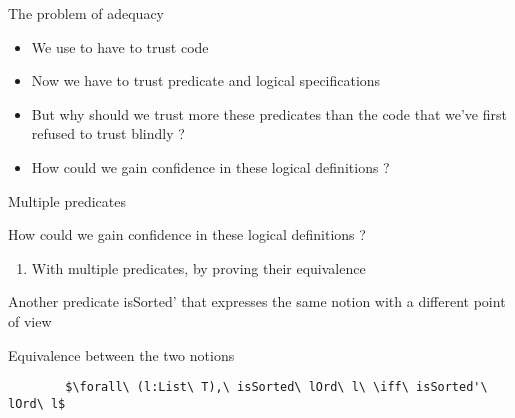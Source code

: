 \documentclass[french]{beamer}
\begin{document}
\begin{frame}{The problem of adequacy}

	\begin{itemize}

\item We use to have to trust code 

\item Now we have to trust predicate and logical specifications

\item But why should we trust more these predicates than the code that we've first refused to trust blindly ?

\item How could we gain confidence in these logical definitions ?

	\end{itemize}

\end{frame}


\begin{frame}[fragile]{Multiple predicates}

How could we gain confidence in these logical definitions ?

\begin{enumerate}
\item With multiple predicates, by proving their equivalence
\end{enumerate}

Another predicate isSorted' that expresses the same notion with a different point of view

	\begin{block}{Equivalence between the two notions}

		\begin{lstlisting}
    	$\forall\ (l:List\ T),\ isSorted\ lOrd\ l\ \iff\ isSorted'\ lOrd\ l$
      
		\end{lstlisting}
	
	\end{block}


\end{frame}
\end{document}
